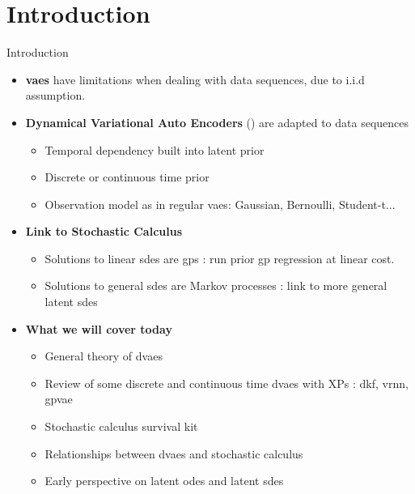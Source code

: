 \section{Introduction}\label{Introduction}

\begin{frame}{Introduction}
    \begin{itemize}
        \item <1-> \textbf{\glspl{vae}} have limitations when dealing with data sequences, due to i.i.d assumption.
        \item <2-> \textbf{Dynamical Variational Auto Encoders} (\cite{girin_dynamical_2022}) are adapted to data sequences
            \begin{itemize}
                \item Temporal dependency built into latent prior
                \item Discrete or continuous time prior
                \item Observation model as in regular \glspl{vae}: Gaussian, Bernoulli, Student-t...
            \end{itemize}
        \item <3-> \textbf{Link to Stochastic Calculus}
            \begin{itemize}
                \item Solutions to linear \glspl{sde} are \glspl{gp} : run prior \gls{gp} regression at linear cost.
                \item Solutions to general \glspl{sde} are Markov processes : link to more general \glspl{latent sde}
            \end{itemize}
        \item <4-> \textbf{What we will cover today}
            \begin{itemize}
                \item General theory of  \glspl{dvae}
                \item Review of some discrete and continuous time \glspl{dvae} with XPs : \gls{dkf}, \gls{vrnn}, \gls{gpvae}
                \item Stochastic calculus survival kit
                \item Relationships between \glspl{dvae} and stochastic calculus
                \item Early perspective on \glspl{latent ode} and \glspl{latent sde}
            \end{itemize}
    \end{itemize}
\end{frame}